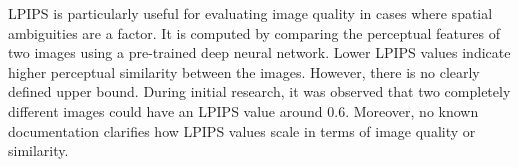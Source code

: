 LPIPS is particularly useful for evaluating image quality in cases where spatial ambiguities are a factor. It is computed by comparing the perceptual features of two images using a pre-trained deep neural network. Lower LPIPS values indicate higher perceptual similarity between the images. However, there is no clearly defined upper bound. During initial research, it was observed that two completely different images could have an LPIPS value around 0.6. Moreover, no known documentation clarifies how LPIPS values scale in terms of image quality or similarity.

